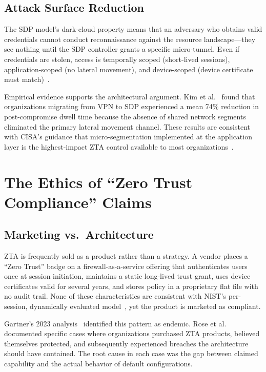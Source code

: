\documentclass[sigconf,nonacm]{acmart}
\begin{document}
\subsection{Attack Surface Reduction}

The SDP model's dark-cloud property means that an adversary who obtains valid
credentials cannot conduct reconnaissance against the resource landscape---they
see nothing until the SDP controller grants a specific micro-tunnel. Even if
credentials are stolen, access is temporally scoped (short-lived sessions),
application-scoped (no lateral movement), and device-scoped (device certificate
must match)~\cite{patel_sdp_zt2024,csa_sdp2023}.

Empirical evidence supports the architectural argument. Kim et
al.~\cite{kim_ml_zt2024} found that organizations migrating from VPN to SDP
experienced a mean 74\% reduction in post-compromise dwell time because the
absence of shared network segments eliminated the primary lateral movement
channel. These results are consistent with CISA's guidance that
micro-segmentation implemented at the application layer is the highest-impact
ZTA control available to most organizations~\cite{cisa_zt_strategy2022}.

\section{The Ethics of ``Zero Trust Compliance'' Claims}
\label{sec:ethics}

\subsection{Marketing vs.\ Architecture}

ZTA is frequently sold as a product rather than a strategy. A vendor places a
``Zero Trust'' badge on a firewall-as-a-service offering that authenticates
users once at session initiation, maintains a static long-lived trust grant,
uses device certificates valid for several years, and stores policy in a
proprietary flat file with no audit trail. None of these characteristics are
consistent with NIST's per-session, dynamically evaluated
model~\cite{nist800207}, yet the product is marketed as compliant.

Gartner's 2023 analysis~\cite{gartner_zt_market2023} identified this pattern
as endemic. Rose et al.~\cite{rose_zt_pitfalls2022} documented specific cases
where organizations purchased ZTA products, believed themselves protected, and
subsequently experienced breaches the architecture should have contained. The
root cause in each case was the gap between claimed capability and the actual
behavior of default configurations.
\end{document}
